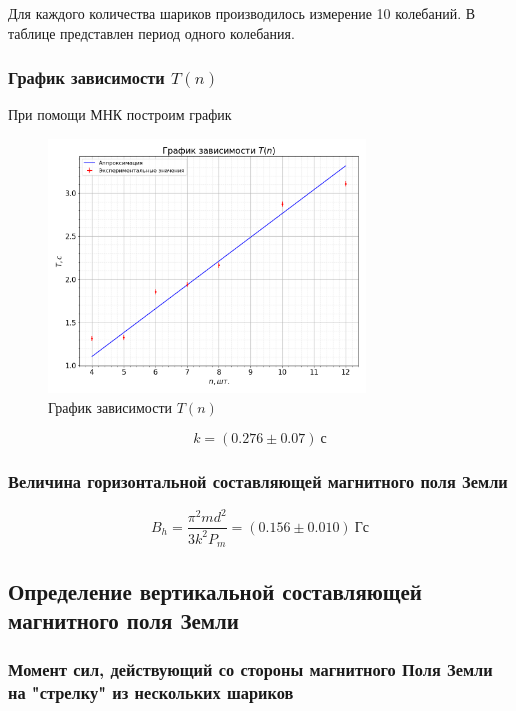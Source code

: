 \documentclass[a4paper, 12pt]{article}
\begin{document}
                Для каждого количества шариков производилось измерение 10 колебаний. В таблице представлен период одного колебания.

            \subsubsection{График зависимости $T(n)$}

                При помощи МНК построим график

                \begin{figure}[!ht]
                    \centering
                    \includegraphics[width=0.75\textwidth]{img/horizontal.png}
                    \caption{График зависимости $T(n)$}
                    \label{plot:n_T_horizontal}
                \end{figure}

                $$
                    k = (0.276 \pm 0.07)~с
                $$

            \subsubsection{Величина горизонтальной составляющей магнитного поля Земли}

                $$
                    B_h = \frac{\pi^2md^2}{3k^2P_m} = (0.156 \pm 0.010)~Гс
                $$

        \subsection{Определение вертикальной составляющей магнитного поля Земли}

            \subsubsection{Момент сил, действующий со стороны магнитного Поля Земли на "стрелку" из нескольких шариков}
\end{document}
